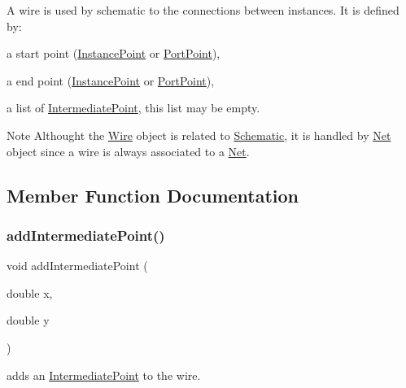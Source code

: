 A wire is used by schematic to the connections between instances. It is defined by\+:
\begin{DoxyItemize}
\item a start point (\mbox{\hyperlink{class_open_chams_1_1_instance_point}{Instance\+Point}} or \mbox{\hyperlink{class_open_chams_1_1_port_point}{Port\+Point}}),
\item a end point (\mbox{\hyperlink{class_open_chams_1_1_instance_point}{Instance\+Point}} or \mbox{\hyperlink{class_open_chams_1_1_port_point}{Port\+Point}}),
\item a list of \mbox{\hyperlink{class_open_chams_1_1_intermediate_point}{Intermediate\+Point}}, this list may be empty.
\end{DoxyItemize}

\begin{DoxyNote}{Note}
Althought the \mbox{\hyperlink{class_open_chams_1_1_wire}{Wire}} object is related to \mbox{\hyperlink{class_open_chams_1_1_schematic}{Schematic}}, it is handled by \mbox{\hyperlink{class_open_chams_1_1_net}{Net}} object since a wire is always associated to a \mbox{\hyperlink{class_open_chams_1_1_net}{Net}}. 
\end{DoxyNote}


\subsection{Member Function Documentation}
\mbox{\label{class_open_chams_1_1_wire_aab66049b1f5ccf8de85249720152833a}} 
\subsubsection{\texorpdfstring{add\+Intermediate\+Point()}{addIntermediatePoint()}}
{\footnotesize\ttfamily void add\+Intermediate\+Point (\begin{DoxyParamCaption}\item[{double}]{x,  }\item[{double}]{y }\end{DoxyParamCaption})}



adds an \mbox{\hyperlink{class_open_chams_1_1_intermediate_point}{Intermediate\+Point}} to the wire. 



